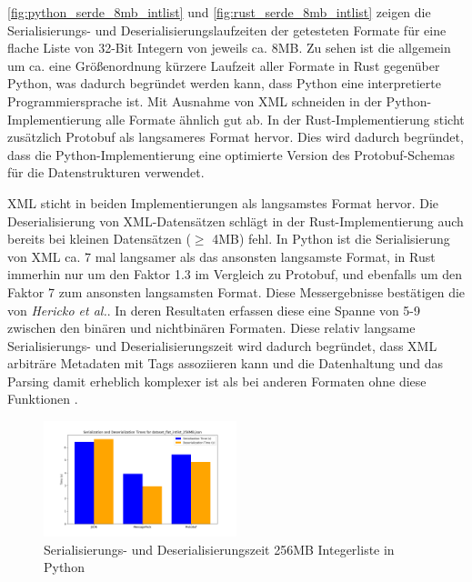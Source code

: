 \documentclass[ngerman]{seminarvorlage}
\begin{document}
\autoref{fig:python_serde_8mb_intlist} und \autoref{fig:rust_serde_8mb_intlist} zeigen die Serialisierungs- und Deserialisierungslaufzeiten der getesteten Formate für eine flache Liste von 32-Bit Integern von jeweils ca. 8MB. Zu sehen ist die allgemein um ca. eine Größenordnung kürzere Laufzeit aller Formate in Rust gegenüber Python, was dadurch begründet werden kann, dass Python eine interpretierte Programmiersprache ist. Mit Ausnahme von XML schneiden in der Python-Implementierung alle Formate ähnlich gut ab. In der Rust-Implementierung sticht zusätzlich Protobuf als langsameres Format hervor. Dies wird dadurch begründet, dass die Python-Implementierung eine optimierte Version des Protobuf-Schemas für die Datenstrukturen verwendet. 

XML sticht in beiden Implementierungen als langsamstes Format hervor. Die Deserialisierung von XML-Datensätzen schlägt in der Rust-Implementierung auch bereits bei kleinen Datensätzen ($\ge$ 4MB) fehl. In Python ist die Serialisierung von XML ca. 7 mal langsamer als das ansonsten langsamste Format, in Rust immerhin nur um den Faktor 1.3 im Vergleich zu Protobuf, und ebenfalls um den Faktor 7 zum ansonsten langsamsten Format. Diese Messergebnisse bestätigen die von \textit{Hericko et al.}. In deren Resultaten erfassen diese eine Spanne von 5-9 \cite[ Kapitel 5]{10.1145/944579.944589} zwischen den binären und nichtbinären Formaten. Diese relativ langsame Serialisierungs- und Deserialisierungszeit wird dadurch begründet, dass XML arbiträre Metadaten mit Tags assoziieren kann und die Datenhaltung und das Parsing damit erheblich komplexer ist als bei anderen Formaten ohne diese Funktionen \cite[Kapitel 4.1]{10.1145/944579.944589}.

\begin{figure}[h]
  \centering
  \includegraphics[width=0.5\textwidth]{images/graphs/python_dataset_flat_intlist_256MB_json_combined_times.png}
  \caption{Serialisierungs- und Deserialisierungszeit 256MB Integerliste in Python}
  \label{fig:python_serde_256mb_intlist}
\end{figure}
\end{document}
